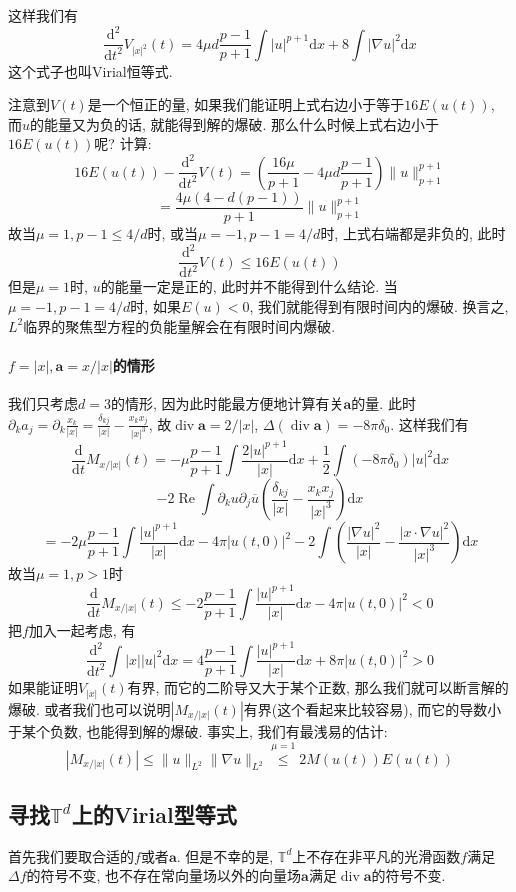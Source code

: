\documentclass{ctexbook}
\theoremstyle{definition}
\theoremstyle{remark}
\newcommand{\dif}{\mathrm{d}}
\newcommand{\ovl}{\overline}
\begin{document}
这样我们有
$$\frac{\dif^2}{\dif t^2}V_{|x|^2}(t)=4\mu d\frac{p-1}{p+1}\int|u|^{p+1}\dif x+8\int|\nabla u|^2\dif x$$
这个式子也叫Virial恒等式. 

注意到$V(t)$是一个恒正的量, 如果我们能证明上式右边小于等于$16E(u(t))$, 而$u$的能量又为负的话, 就能得到解的爆破. 那么什么时候上式右边小于$16E(u(t))$呢? 计算: 
$$16E(u(t))-\frac{\dif^2}{\dif t^2}V(t)=\left(\frac{16\mu}{p+1}-4\mu d\frac{p-1}{p+1}\right)\|u\|_{p+1}^{p+1}$$
$$=\frac{4\mu(4-d(p-1))}{p+1}\|u\|_{p+1}^{p+1}$$
故当$\mu=1,p-1\le4/d$时, 或当$\mu=-1,p-1=4/d$时, 上式右端都是非负的, 此时
$$\frac{\dif^2}{\dif t^2}V(t)\le16E(u(t))$$
但是$\mu=1$时, $u$的能量一定是正的, 此时并不能得到什么结论. 当$\mu=-1,p-1=4/d$时, 如果$E(u)<0$, 我们就能得到有限时间内的爆破. 换言之, $L^2$临界的聚焦型方程的负能量解会在有限时间内爆破. 

\paragraph{$f=|x|,\bm{a}=x/|x|$的情形}我们只考虑$d=3$的情形, 因为此时能最方便地计算有关$\bm{a}$的量. 此时$\partial_ka_j=\partial_k\frac{x_k}{|x|}=\frac{\delta_{kj}}{|x|}-\frac{x_kx_j}{|x|^3}$, 故$\operatorname{div}\bm{a}=2/|x|$, $\Delta(\operatorname{div}\bm{a})=-8\pi\delta_0$. 这样我们有
$$\frac{\dif}{\dif t}M_{x/|x|}(t)=-\mu\frac{p-1}{p+1}\int\frac{2|u|^{p+1}}{|x|}\dif x+\frac{1}{2}\int(-8\pi\delta_0)|u|^2\dif x$$
$$-2\operatorname{Re}\int\partial_ku\partial_j\ovl{u}\left(\frac{\delta_{kj}}{|x|}-\frac{x_kx_j}{|x|^3}\right)\dif x$$
$$=-2\mu\frac{p-1}{p+1}\int\frac{|u|^{p+1}}{|x|}\dif x-4\pi|u(t,0)|^2-2\int\left(\frac{|\nabla u|^2}{|x|}-\frac{|x\cdot\nabla u|^2}{|x|^3}\right)\dif x$$
故当$\mu=1,p>1$时
$$\frac{\dif}{\dif t}M_{x/|x|}(t)\le-2\frac{p-1}{p+1}\int\frac{|u|^{p+1}}{|x|}\dif x-4\pi|u(t,0)|^2<0$$
把$f$加入一起考虑, 有
$$\frac{\dif^2}{\dif t^2}\int|x||u|^2\dif x=4\frac{p-1}{p+1}\int\frac{|u|^{p+1}}{|x|}\dif x+8\pi|u(t,0)|^2>0$$
如果能证明$V_{|x|}(t)$有界, 而它的二阶导又大于某个正数, 那么我们就可以断言解的爆破. 或者我们也可以说明$|M_{x/|x|}(t)|$有界(这个看起来比较容易), 而它的导数小于某个负数, 也能得到解的爆破. 事实上, 我们有最浅易的估计: 
$$|M_{x/|x|}(t)|\le\|u\|_{L^2}\|\nabla u\|_{L^2}\overset{\mu=1}{\le}2M(u(t))E(u(t))$$

\subsection{寻找$\mathbb{T}^d$上的Virial型等式}首先我们要取合适的$f$或者$\bm{a}$. 但是不幸的是, $\mathbb{T}^d$上不存在非平凡的光滑函数$f$满足$\Delta f$的符号不变, 也不存在常向量场以外的向量场$\bm{a}$满足$\operatorname{div}\bm{a}$的符号不变. 
\end{document}
